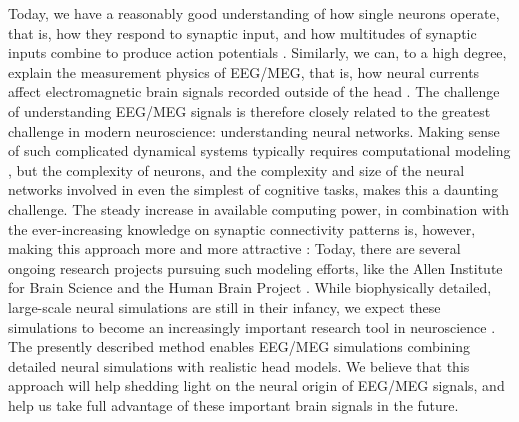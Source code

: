 \documentclass[preprint,10pt,authoryear]{elsarticle}
\begin{document}
Today, we have a reasonably good understanding of how single neurons operate, that is, how they respond to synaptic input, and how multitudes of synaptic inputs combine to produce action potentials \citep{EINEVOLL2019}.
Similarly, we can, to a high degree, explain the measurement physics of EEG/MEG, that is, how neural currents affect electromagnetic brain signals recorded outside of the head \citep{NUNEZ2006, COHEN2017,Ilmoniemi2019}.
The challenge of understanding EEG/MEG signals is therefore closely related to the greatest challenge in modern neuroscience: understanding neural networks. 
Making sense of such complicated dynamical systems typically requires computational modeling \citep{EINEVOLL2019}, but the complexity of neurons, and the complexity and size of the neural networks involved in even the simplest of cognitive tasks, makes this a daunting challenge.
The steady increase in available computing power, in combination with the ever-increasing knowledge on synaptic connectivity patterns is, however, making this approach more and more attractive \citep{Reimann2013, Egger2014, MARKRAM2015, HAGEN2016, Gratiy2018, Arkhipov2018, Reimann2019, BILLEH2019}: Today, there are several ongoing research projects pursuing such modeling efforts, like the Allen Institute for Brain Science and the Human Brain Project \citep{EINEVOLL2019}.
While biophysically detailed, large-scale neural simulations are still in their infancy, we expect these simulations to become an increasingly important research tool in neuroscience \citep{EINEVOLL2019}.
The presently described method enables EEG/MEG simulations combining detailed neural simulations with realistic head models. We believe that this approach will help shedding light on the neural origin of EEG/MEG signals, and help us take full advantage of these important brain signals in the future.
\end{document}
